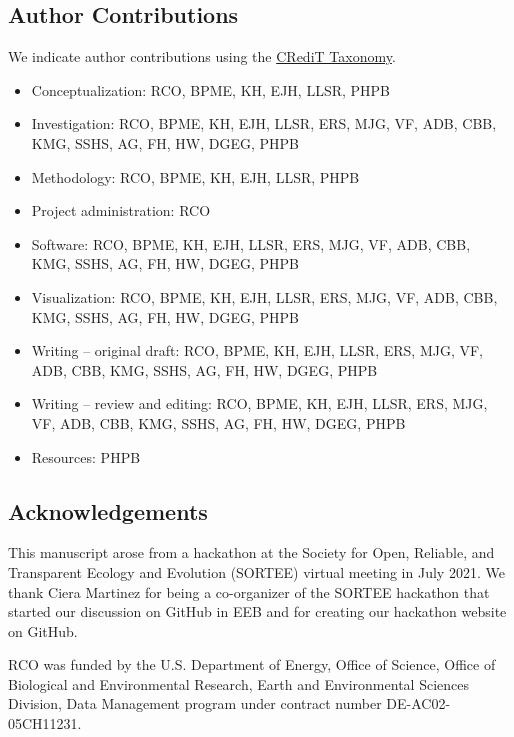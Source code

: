 \hypertarget{author-contributions}{%
\subsection{Author Contributions}\label{author-contributions}}

We indicate author contributions using the \href{https://casrai.org/credit/}{CRediT Taxonomy}.

\begin{itemize}
\tightlist
\item
  Conceptualization: RCO, BPME, KH, EJH, LLSR, PHPB
\item
  Investigation: RCO, BPME, KH, EJH, LLSR, ERS, MJG, VF, ADB, CBB, KMG, SSHS, AG, FH, HW, DGEG, PHPB
\item
  Methodology: RCO, BPME, KH, EJH, LLSR, PHPB
\item
  Project administration: RCO
\item
  Software: RCO, BPME, KH, EJH, LLSR, ERS, MJG, VF, ADB, CBB, KMG, SSHS, AG, FH, HW, DGEG, PHPB
\item
  Visualization: RCO, BPME, KH, EJH, LLSR, ERS, MJG, VF, ADB, CBB, KMG, SSHS, AG, FH, HW, DGEG, PHPB
\item
  Writing -- original draft: RCO, BPME, KH, EJH, LLSR, ERS, MJG, VF, ADB, CBB, KMG, SSHS, AG, FH, HW, DGEG, PHPB
\item
  Writing -- review and editing: RCO, BPME, KH, EJH, LLSR, ERS, MJG, VF, ADB, CBB, KMG, SSHS, AG, FH, HW, DGEG, PHPB
\item
  Resources: PHPB
\end{itemize}

\hypertarget{acknowledgements}{%
\subsection{Acknowledgements}\label{acknowledgements}}

This manuscript arose from a hackathon at the Society for Open, Reliable, and Transparent Ecology and Evolution (SORTEE) virtual meeting in July 2021.
We thank Ciera Martinez for being a co-organizer of the SORTEE hackathon that started our discussion on GitHub in EEB and for creating our hackathon website on GitHub.

RCO was funded by the U.S. Department of Energy, Office of Science, Office of Biological and Environmental Research, Earth and Environmental Sciences Division, Data Management program under contract number DE-AC02-05CH11231.

